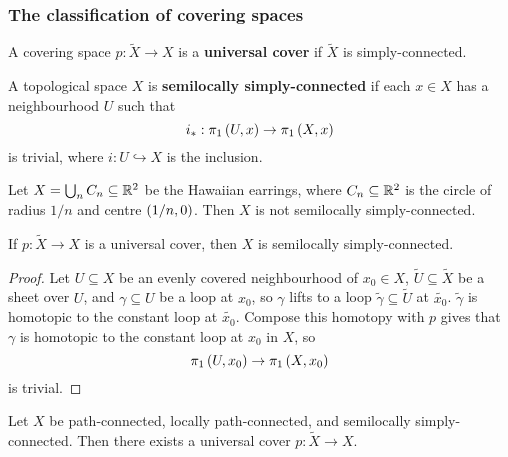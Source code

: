 
\subsubsection{The classification of covering spaces}

\begin{definition*}
A covering space $ p : \widetilde{X} \to X $ is a \textbf{universal cover} if $ \widetilde{X} $ is simply-connected.
\end{definition*}

\begin{definition*}
A topological space $ X $ is \textbf{semilocally simply-connected} if each $ x \in X $ has a neighbourhood $ U $ such that
$$ i_* : \pi_1\left( U, x \right) \to \pi_1\left( X, x \right) $$
is trivial, where $ i : U \hookrightarrow X $ is the inclusion.
\end{definition*}

\begin{example*}
Let $ X = \bigcup_n C_n \subseteq \mathbb{R}^2 $ be the Hawaiian earrings, where $ C_n \subseteq \mathbb{R}^2 $ is the circle of radius $ 1 / n $ and centre $ \left( 1 / n, 0 \right) $. Then $ X $ is not semilocally simply-connected.
\end{example*}

\begin{proposition}
If $ p : \widetilde{X} \to X $ is a universal cover, then $ X $ is semilocally simply-connected.
\end{proposition}

\begin{proof}
Let $ U \subseteq X $ be an evenly covered neighbourhood of $ x_0 \in X $, $ \widetilde{U} \subseteq \widetilde{X} $ be a sheet over $ U $, and $ \gamma \subseteq U $ be a loop at $ x_0 $, so $ \gamma $ lifts to a loop $ \widetilde{\gamma} \subseteq \widetilde{U} $ at $ \widetilde{x_0} $. $ \widetilde{\gamma} $ is homotopic to the constant loop at $ \widetilde{x_0} $. Compose this homotopy with $ p $ gives that $ \gamma $ is homotopic to the constant loop at $ x_0 $ in $ X $, so
$$ \pi_1\left( U, x_0 \right) \to \pi_1\left( X, x_0 \right) $$
is trivial.
\end{proof}

\pagebreak

\begin{theorem}
Let $ X $ be path-connected, locally path-connected, and semilocally simply-connected. Then there exists a universal cover $ p : \widetilde{X} \to X $.
\end{theorem}

